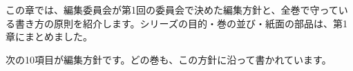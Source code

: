 \ifdefined\kgbsec\else{}\fi

\label{kgb-ch2}

この章では、編集委員会が第1回の委員会で決めた編集方針と、全巻で守っている書き方の原則を紹介します。シリーズの目的・巻の並び・紙面の部品は、第1章にまとめました。


次の10項目が編集方針です。どの巻も、この方針に沿って書かれています。

